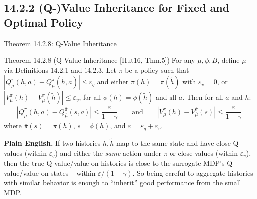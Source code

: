 \documentclass[aspectratio=169,10pt]{beamer}
\begin{document}
\subsection{14.2.2 (Q-)Value Inheritance for Fixed and Optimal Policy}

\begin{frame}{Theorem 14.2.8: Q-Value Inheritance}
  \begin{block}{Theorem 14.2.8 (Q-Value Inheritance [Hut16, Thm.5])}
    For any $\mu,\phi,B$, define $\overline\mu$ via Definitions 14.2.1 and
    14.2.3. Let $\pi$ be a policy such that
    $|Q_\mu^\pi(h,a)-Q_\mu^\pi(\tilde h,a)|\le\varepsilon_q$ and either
    $\pi(h)=\pi(\tilde h)$ with $\varepsilon_v=0$, or
    $|V_\mu^\pi(h)-V_\mu^\pi(\tilde h)|\le\varepsilon_v$, for all
    $\phi(h)=\phi(\tilde h)$ and all $a$. Then for all $a$ and $h$:
    \[
      |Q_\mu^\pi(h,a)-Q_{\overline\mu}^{\overline\pi}(s,a)| \le \frac{\varepsilon}{1-\gamma}
      \qquad\text{and}\qquad
      |V_\mu^\pi(h)-V_{\overline\mu}^{\overline\pi}(s)| \le \frac{\varepsilon}{1-\gamma}
    \]
    where $\overline\pi(s)=\pi(h)$, $s=\phi(h)$, and $\varepsilon=\varepsilon_q+\varepsilon_v$.
  \end{block}
  \textbf{Plain English.} If two histories $h,\tilde h$ map to the same
  state and have close Q-values (within $\varepsilon_q$) and either the
  \emph{same} action under $\pi$ or close values (within $\varepsilon_v$),
  then the true Q-value/value on histories is close to the surrogate MDP's
  Q-value/value on states -- within $\varepsilon/(1-\gamma)$. So being
  careful to aggregate histories with similar behavior is enough to
  ``inherit'' good performance from the small MDP.
\end{frame}
\end{document}
